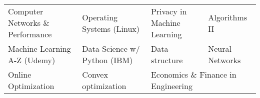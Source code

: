 \begin{tabular}{p{6cm}p{5cm}p{5cm}p{5cm}}
	Computer Networks \& Performance & Operating Systems (Linux) & Privacy in Machine Learning & Algorithms II\\
	Machine Learning A-Z (Udemy) & Data Science w/ Python (IBM) & Data structure & Neural Networks \\
	Online Optimization & Convex optimization & \multicolumn{2}{l}{Economics \& Finance in Engineering}
\end{tabular}